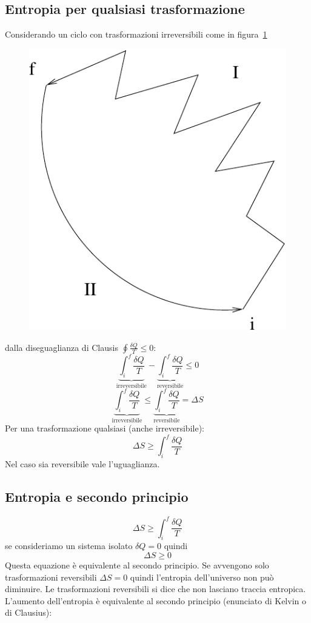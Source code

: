 \subsection{Entropia per qualsiasi trasformazione}
Considerando un ciclo con trasformazioni irreversibili come in figura~\ref{fig:ciclo_misto}
\begin{figure}[!htbp]
\centering
\includegraphics[scale=0.5]{immagini/fisica1/ciclo_misto}
\label{fig:ciclo_misto}
\end{figure}
dalla diseguaglianza di Clausis $\oint\frac{\delta Q}{T}\leq 0$:
\[\underbrace{\int_i^f\frac{\delta Q}{T}}_\text{irreversibile}-\underbrace{\int_i^f\frac{\delta Q}{T}}_\text{reversibile}\leq 0\]
\[\underbrace{\int_i^f\frac{\delta Q}{T}}_\text{irreversibile}\leq\underbrace{\int_i^f\frac{\delta Q}{T}}_\text{reversibile}=\Delta S\]
Per una trasformazione qualsiasi (anche irreversibile):
\[\Delta S\geq\int_i^f\frac{\delta Q}{T}\]
Nel caso sia reversibile vale l'uguaglianza.

\subsection{Entropia e secondo principio}
\[\Delta S\geq\int_i^f\frac{\delta Q}{T}\]
se consideriamo un sistema isolato $\delta Q=0$ quindi
\begin{equation}
\Delta S\geq 0 
\end{equation}
Questa equazione è equivalente al secondo principio. Se avvengono solo trasformazioni reversibili $\Delta S=0$ quindi l'entropia dell'universo non può diminuire. Le trasformazioni reversibili si dice che non lasciano traccia entropica. L'aumento dell'entropia è equivalente al secondo principio (enunciato di Kelvin o di Clausius):
